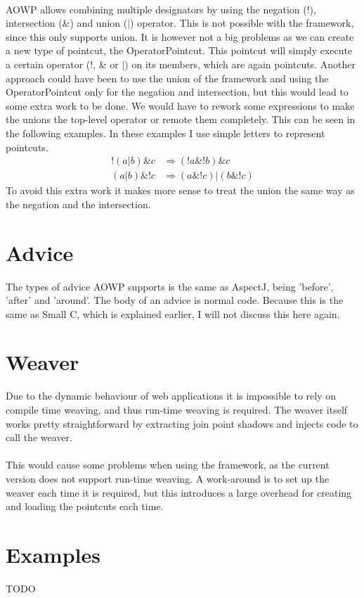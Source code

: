 \documentclass[a4paper]{report}
\begin{document}
\\
AOWP allows combining multiple designators by using the negation (!), intersection (\&) and union ($|$) operator. This is not possible with the framework, since this only supports union. It is however not a big problems as we can create a new type of pointcut, the OperatorPointcut. This pointcut will simply execute a certain operator (!, \& or $|$) on its members, which are again pointcuts. Another approach could have been to use the union of the framework and using the OperatorPointcut only for the negation and intersection, but this would lead to some extra work to be done. We would have to rework some expressions to make the unions the top-level operator or remote them completely. This can be seen in the following examples. In these examples I use simple letters to represent pointcuts.\\
\begin{align*}
!\left(a | b\right) \& c & \Rightarrow \left(!a \& !b\right) \& c\\
\left(a | b \right) \& !c & \Rightarrow \left(a \& !c\right) | \left(b \& !c \right)
\end{align*}
To avoid this extra work it makes more sense to treat the union the same way as the negation and the intersection.

\section{Advice}
The types of advice AOWP supports is the same as AspectJ, being 'before', 'after' and 'around'. The body of an advice is normal code. Because this is the same as Small C, which is explained earlier, I will not discuss this here again.

\section{Weaver}
Due to the dynamic behaviour of web applications it is impossible to rely on compile time weaving, and thus run-time weaving is required. The weaver itself works pretty straightforward by extracting join point shadows and injects code to call the weaver.\\
\\
This would cause some problems when using the framework, as the current version does not support run-time weaving. A work-around is to set up the weaver each time it is required, but this introduces a large overhead for creating and loading the pointcuts each time.
\section{Examples}
TODO
\end{document}
